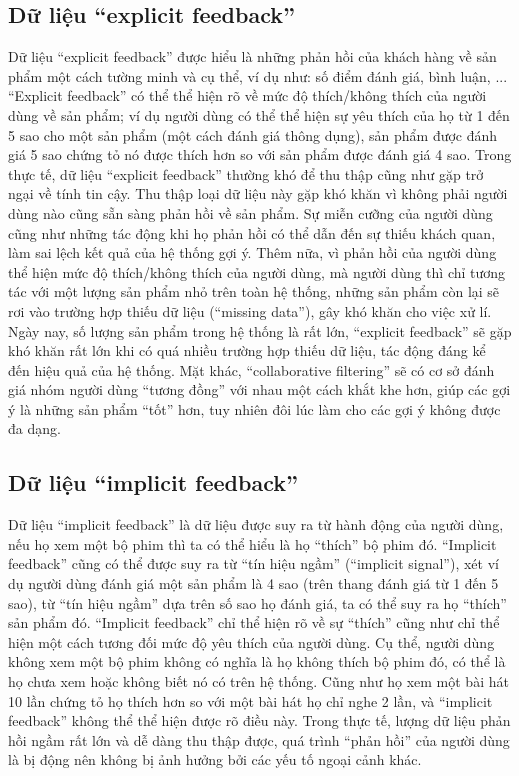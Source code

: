     \subsection{Dữ liệu ``explicit feedback''}
    Dữ liệu ``explicit feedback'' được hiểu là những
    phản hồi của khách hàng về sản phẩm một cách tường minh và cụ thể, ví dụ như: số điểm đánh giá,
    bình luận, ... ``Explicit feedback'' có thể thể hiện rõ về mức độ thích/không thích của người dùng về sản phẩm;
    ví dụ người dùng có thể thể hiện sự yêu thích của họ từ 1 đến 5 sao cho một sản phẩm (một cách đánh giá thông dụng), 
    sản phẩm được đánh giá 5 sao chứng tỏ nó được thích hơn so với sản phẩm được đánh giá 4 sao. 
    Trong thực tế, dữ liệu ``explicit feedback'' thường khó để thu thập cũng như gặp trở ngại về tính tin cậy.
    Thu thập loại dữ liệu này gặp khó khăn vì không phải người dùng nào cũng sẵn sàng phản hồi về sản phẩm. 
    Sự miễn cưỡng của người dùng cũng như những tác động khi họ phản hồi có thể dẫn đến sự thiếu khách quan,
    làm sai lệch kết quả của hệ thống gợi ý. 
    Thêm nữa, vì phản hồi của người dùng thể hiện mức độ thích/không thích của người dùng, mà người dùng thì chỉ tương tác với
    một lượng sản phẩm nhỏ trên toàn hệ thống, những sản phẩm còn lại sẽ rơi vào trường hợp thiếu dữ liệu (``missing data''),
    gây khó khăn cho việc xử lí. 
    Ngày nay, số lượng sản phẩm trong hệ thống là rất lớn, ``explicit feedback'' sẽ gặp khó khăn rất lớn khi có quá nhiều trường hợp thiếu dữ liệu,
    tác động đáng kể đến hiệu quả của hệ thống. Mặt khác, ``collaborative filtering'' sẽ có cơ sở đánh giá nhóm người dùng ``tương đồng'' với nhau
    một cách khắt khe hơn, giúp các gợi ý là những sản phẩm ``tốt'' hơn, tuy nhiên đôi lúc làm cho các gợi ý không được đa dạng.

    \subsection{Dữ liệu ``implicit feedback''}
    Dữ liệu ``implicit feedback'' là dữ liệu được suy ra từ hành động của người dùng, nếu họ xem một bộ phim thì ta có thể hiểu là họ ``thích'' bộ phim đó. ``Implicit feedback'' cũng có thể được suy ra từ ``tín hiệu ngầm'' (``implicit signal''),
    xét ví dụ người dùng đánh giá một sản phẩm là 4 sao (trên thang đánh giá từ 1 đến 5 sao), từ ``tín hiệu ngầm'' dựa trên số sao họ đánh giá,
    ta có thể suy ra họ ``thích'' sản phẩm đó. 
    ``Implicit feedback'' chỉ thể hiện rõ về sự ``thích'' cũng như chỉ thể hiện một cách tương đối mức độ yêu thích của người dùng.
    Cụ thể, người dùng không xem một bộ phim không có nghĩa là họ không thích bộ phim đó, có thể là họ chưa xem hoặc không biết nó có trên hệ thống.
    Cũng như họ xem một bài hát 10 lần chứng tỏ họ thích hơn so với một bài hát họ chỉ nghe 2 lần, 
    và ``implicit feedback'' không thể thể hiện được rõ điều này.
    Trong thực tế, lượng dữ liệu phản hồi ngầm rất lớn và dễ dàng thu thập được, quá trình ``phản hồi'' của người dùng là bị động
    nên không bị ảnh hưởng bởi các yếu tố ngoại cảnh khác. 

